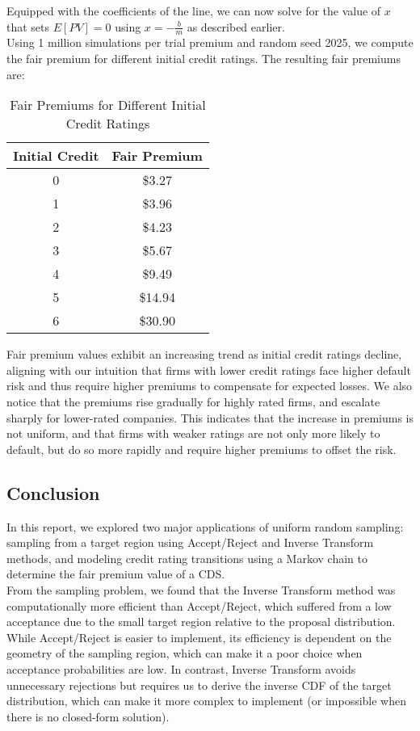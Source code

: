 \documentclass{report}
\begin{document}
Equipped with the coefficients of the line, we can now solve for the value of $x$ that sets $E[PV]=0$ using $x = -\frac{b}{m}$ as described earlier. \\

Using 1 million simulations per trial premium and random seed 2025, we compute the fair premium for different initial credit ratings. The resulting fair premiums are:

\begin{table}[h]
    \centering
    \begin{tabular}{|c|c|}
        \hline
        \textbf{Initial Credit} & \textbf{Fair Premium} \\
        \hline
        0 & \$3.27 \\
        1 & \$3.96 \\
        2 & \$4.23 \\
        3 & \$5.67 \\
        4 & \$9.49 \\
        5 & \$14.94 \\
        6 & \$30.90 \\
        \hline
    \end{tabular}
    \caption{Fair Premiums for Different Initial Credit Ratings}
    \label{tab:expected_pv}
\end{table}

Fair premium values exhibit an increasing trend as initial credit ratings decline, aligning with our intuition that firms with lower credit ratings face higher default risk and thus require higher premiums to compensate for expected losses. We also notice that the premiums rise gradually for highly rated firms, and escalate sharply for lower-rated companies. This indicates that the increase in premiums is not uniform, and that firms with weaker ratings are not only more likely to default, but do so more rapidly and require higher premiums to offset the risk.

\subsection*{Conclusion}
In this report, we explored two major applications of uniform random sampling: sampling from a target region using Accept/Reject and Inverse Transform methods, and modeling credit rating transitions using a Markov chain to determine the fair premium value of a CDS. \\

From the sampling problem, we found that the Inverse Transform method was computationally more efficient than Accept/Reject, which suffered from a low acceptance due to the small target region relative to the proposal distribution. While Accept/Reject is easier to implement, its efficiency is dependent on the geometry of the sampling region, which can make it a poor choice when acceptance probabilities are low. In contrast, Inverse Transform avoids unnecessary rejections but requires us to derive the inverse CDF of the target distribution, which can make it more complex to implement (or impossible when there is no closed-form solution). \\
\end{document}
